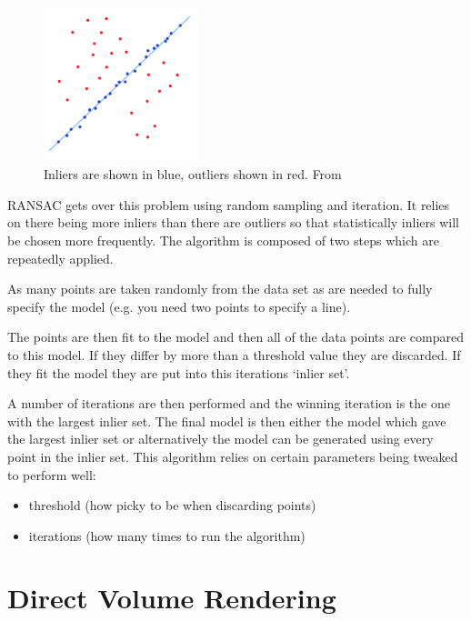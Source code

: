\begin{figure}[h]
    \centering
	\includegraphics[width=0.4\textwidth]{images/background/ransac.png}
    \caption{Inliers are shown in blue, outliers shown in red. From \cite{ransac:image}}
    \label{fig:ransac}
\end{figure}

RANSAC gets over this problem using random sampling and iteration. It relies on there being more inliers than there are outliers so that statistically inliers will be chosen more frequently. The algorithm is composed of two steps which are repeatedly applied.

As many points are taken randomly from the data set as are needed to fully specify the model (e.g. you need two points to specify a line).

The points are then fit to the model and then all of the data points are compared to this model. If they differ by more than a threshold value they are discarded. If they fit the model they are put into this iterations ‘inlier set’.

A number of iterations are then performed and the winning iteration is the one with the largest inlier set. The final model is then either the model which gave the largest inlier set or alternatively the model can be generated using every point in the inlier set. This algorithm relies on certain parameters being tweaked to perform well:

\begin{itemize}
	\item threshold (how picky to be when discarding points)
	\item iterations (how many times to run the algorithm)
\end{itemize}

\newpage
\section{Direct Volume Rendering}\label{background:volumerendering}

